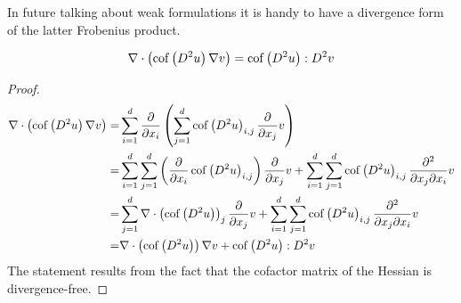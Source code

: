 In future talking about weak formulations it is handy to have a divergence form of the latter Frobenius product.
\begin{lemma} \label{la: An application of the divergernce product rule}
\[
		\nabla \cdot \left( \mycof {D^2 u } \nabla v \right) %
		= \mycof {D^2 u}: D^2 v
\] 
\end{lemma}

\begin{proof}
\begin{align*}
\nabla \cdot \left( \mycof {D^2 u } \nabla v \right) =&%
\sum_{i= 1}^{d} \dx {x_i} 	\left( \sum_{j= 1}^{d} \mycof {D^2 u }_{i,j} \dx{x_j} v \right)\\
=&  \sum_{i= 1}^{d} \sum_{j= 1}^{d}  \left(\dx {x_i} \mycof {D^2 u }_{i,j}  \right) \dx{x_j}v + \sum_{i= 1}^{d} \sum_{j= 1}^{d}  \mycof {D^2 u }_{i,j} \dxy{x_j}{x_i}v\\
=&  \sum_{j= 1}^{d}  \nabla \cdot \left(\mycof {D^2 u }\right)_j \dx{x_j}v + \sum_{i= 1}^{d} \sum_{j= 1}^{d}  \mycof {D^2 u }_{i,j} \dxy{x_j}{x_i}v\\
=&   \nabla \cdot \left(\mycof {D^2 u }\right) \nabla v+ \mycof {D^2 u }:D^2v
\end{align*}
The statement results from the fact that the cofactor matrix of the Hessian is divergence-free.
\end{proof}
